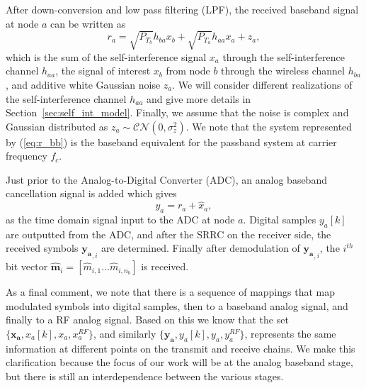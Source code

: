 \documentclass[12pt, journal,draftcls,letterpaper,onecolumn]{IEEEtran}
\begin{document}
After down-conversion and low pass filtering (LPF), the received baseband signal at node $a$ can be written as 
\begin{equation}
r_a = \sqrt{P_{T_b}}h_{ba}x_b + \sqrt{P_{T_a}}h_{aa}x_{a} + z_a,
\label{eq:r_bb}
\end{equation}
which is the sum of the self-interference signal $x_a$ through the self-interference channel $h_{aa}$, the signal of interest $x_b$ from node $b$ through the wireless channel $h_{ba}$, and additive white Gaussian noise $z_a$.  We will consider different realizations of the self-interference channel $h_{aa}$ and give more details in Section~\ref{sec:self_int_model}.  Finally, we assume that the noise is complex and Gaussian distributed as $z_a \sim \mathcal{CN}(0,\sigma_z^2)$.  We note that the system represented by (\ref{eq:r_bb}) is the baseband equivalent for the passband system at carrier frequency $f_c$.

Just prior to the Analog-to-Digital Converter (ADC), an analog baseband cancellation signal is added which gives 
\begin{equation}
y_a = r_a + \widehat{x}_a,
\label{eq:y_bb}
\end{equation}
as the time domain signal input to the ADC at node $a$.  Digital samples $y_a[k]$ are outputted from the ADC, and after the SRRC on the receiver side, the received symbols $\mathbf{y_{a}}_{,i}$ are determined.  Finally after demodulation of $\mathbf{y_{a}}_{,i}$, the $i^{th}$ bit vector $\mathbf{\widehat{m}}_i = [\widehat{m}_{i,1} \dots \widehat{m}_{i,n_b}]$ is received.  

As a final comment, we note that there is 
a sequence of mappings that map modulated symbols into digital samples, then to a baseband analog signal, and finally to a RF analog signal.  Based on this we know that the set $\{\mathbf{x_a}, x_a[k], x_a, x_a^{RF}\}$, and similarly $\{\mathbf{y_a}, y_a[k], y_a, y_a^{RF}\}$, represents the same information at different points on the transmit and receive chains.  We make this clarification because the focus of our work will be at the analog baseband stage, but there is still an interdependence between the various stages.   
\end{document}
